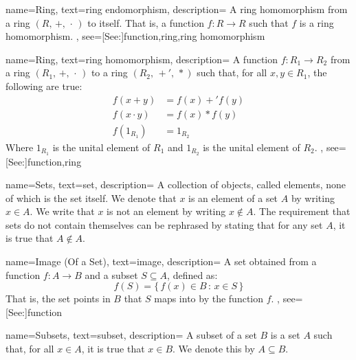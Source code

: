 {
    name={Ring},
    text={ring endomorphism},
    description={
        A ring homomorphism from a ring $(R,\,+,\,\cdot\,)$ to itself.
        That is, a function $f:R\rightarrow{R}$ such that $f$ is a
        ring homomorphism.
    },
    see=[See:]{function,ring,ring homomorphism}
}

{
    name={Ring},
    text={ring homomorphism},
    description={
        A function $f:R_{1}\rightarrow{R}_{2}$ from a ring
        $(R_{1},\,+,\,\cdot\,)$ to a ring $(R_{2},\,+',\,*)$ such that,
        for all $x,y\in{R}_{1}$, the following are true:
        {%
            \begin{align*}
                f(x+y)&=f(x)+'f(y)\\
                f(x\cdot{y})&=f(x)*f(y)\\
                f(1_{R_{1}})&=1_{R_{2}}
            \end{align*}
        }%
        Where $1_{R_{1}}$ is the unital element of $R_{1}$ and
        $1_{R_{2}}$ is the unital element of $R_{2}$.
    },
    see=[See:]{function,ring}
}

{
    name={Sets},
    text={set},
    description={
        A collection of objects, called elements, none of which is the set
        itself. We denote that $x$ is an element of a set $A$ by writing
        $x\in{A}$. We write that $x$ is not an element by writing
        $x\notin{A}$. The requirement that sets do not contain themselves can
        be rephrased by stating that for any set $A$, it is true that
        $A\notin{A}$.
    }
}

{
    name={Image (Of a Set)},
    text={image},
    description={
        A set obtained from a function $f:A\rightarrow{B}$
        and a subset $S\subseteq{A}$, defined as:
        \begin{equation*}
            f(S)=\{\,f(x)\in{B}\,:\,x\in{S}\,\}
        \end{equation*}
        That is, the set points in $B$ that $S$ maps into by the function $f$.
    },
    see=[See:]{function}
}

{
    name={Subsets},
    text={subset},
    description={
        A subset of a set $B$ is a set $A$ such that, for all $x\in{A}$, it is
        true that $x\in{B}$. We denote this by $A\subseteq{B}$.
    }
}

